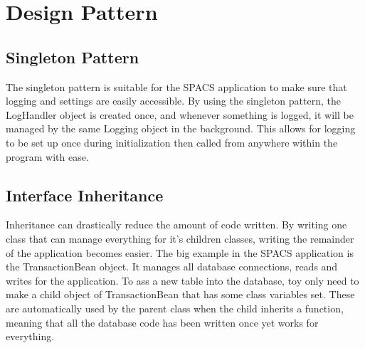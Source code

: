 \section{Design Pattern}

\subsection{Singleton Pattern}
\par
The singleton pattern is suitable for the SPACS application to make sure that logging and settings are easily accessible. By using the singleton pattern, the LogHandler object is created once, and whenever something is logged, it will be managed by the same Logging object in the background. This allows for logging to be set up once during initialization then called from anywhere within the program with ease.

\subsection{Interface Inheritance}
\par
Inheritance can drastically reduce the amount of code written. By writing one class that can manage everything for it's children classes, writing the remainder of the application becomes easier. The big example in the SPACS application is the TransactionBean object. It manages all database connections, reads and writes for the application. To ass a new table into the database, toy only need to make a child object of TransactionBean that has some class variables set. These are automatically used by the parent class when the child inherits a function, meaning that all the database code has been written once yet works for everything.